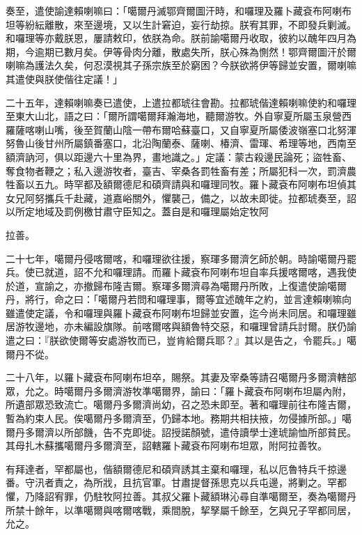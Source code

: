 \begin{pinyinscope}
奏至，遣使諭達賴喇嘛曰：「噶爾丹滅鄂齊爾圖汗時，和囉理及羅卜藏袞布阿喇布坦等紛紜離散，來至邊境，又以生計窘迫，妄行劫掠。朕宥其罪，不即發兵剿滅。和囉理等亦戴朕恩，屢請敕印，依朕為命。朕前諭噶爾丹收取，彼約以醜年四月為期，今逾期已數月矣。伊等骨肉分離，散處失所，朕心殊為惻然！鄂齊爾圖汗於爾喇嘛為護法久矣，何忍漠視其子孫宗族至於窮困？今朕欲將伊等歸並安置，爾喇嘛其遣使與朕使偕往定議！」

二十五年，達賴喇嘛奏已遣使，上遣拉都琥往會勘。拉都琥偕達賴喇嘛使約和囉理至東大山北，語之曰：「爾所謂噶爾拜瀚海地，聽爾游牧。外自寧夏所屬玉泉營西羅薩喀喇山嘴，後至賀蘭山陰一帶布爾哈蘇臺口，又自寧夏所屬倭波嶺塞口北努渾努魯山後甘州所屬鎮番塞口，北沿陶蘭泰、薩喇、椿濟、雷琿、希理等地，西南至額濟訥河，俱以距邊六十里為界，畫地識之。」定議：蒙古殺邊民論死；盜牲畜、奪食物者鞭之；私入邊游牧者，臺吉、宰桑各罰牲畜有差；所屬犯科一次，罰濟農牲畜以五九。時罕都及額爾德尼和碩齊請與和囉理同牧。羅卜藏袞布阿喇布坦偵其女兄阿努攜兵千赴藏，道嘉峪關外，懼襲己，備之，以故未即徙。拉都琥奏至，詔以所定地域及罰例檄甘肅守臣知之。蓋自是和囉理屬始定牧阿

拉善。

二十七年，噶爾丹侵喀爾喀，和囉理欲往援，察琿多爾濟乞師於朝。時諭噶爾丹罷兵。使已就道，詔不允和囉理請。而羅卜藏袞布阿喇布坦自率兵援喀爾喀，遇我使於道，宣諭之，亦撤歸布隆吉爾。察琿多爾濟尋為噶爾丹所敗，上復遣使諭噶爾丹，將行，命之曰：「噶爾丹若問和囉理事，爾等宜述醜年之約，並言達賴喇嘛向雖遣使定議，令和囉理與羅卜藏袞布阿喇布坦歸並安置，迄今尚未同居。和囉理雖居游牧邊地，亦未編設旗隊。前喀爾喀與額魯特交惡，和囉理曾請兵討爾。朕仍諭遣之曰：『朕欲使爾等安處游牧而已，豈肯給爾兵耶？』其以是告之，令罷兵。」噶爾丹不從。

二十八年，以羅卜藏袞布阿喇布坦卒，賜祭。其妻及宰桑等請召噶爾丹多爾濟轄部眾，允之。時噶爾丹多爾濟游牧準噶爾界，諭曰：「羅卜藏袞布阿喇布坦屬內附，所遺部眾恐致流亡。噶爾丹多爾濟尚幼，召之恐未即至。著和囉理前往布隆吉爾，暫為約束人民。俟噶爾丹多爾濟至，仍歸本地。務期共相扶掖，勿侵據所部。」噶爾丹多爾濟以所部饑，告不克即徙。詔授諾顏號，遣侍讀學士達琥諭恤所部貧民。其母扎木蘇攜噶爾丹多爾濟至，詔轄羅卜藏袞布阿喇布坦眾，附阿拉善牧。

有拜達者，罕都屬也，偕額爾德尼和碩齊誘其主棄和囉理，私以厄魯特兵千掠邊番。守汛者責之，為所戕，且抗官軍。甘肅提督孫思克以兵屯邊，將剿之。罕都懼，乃降詔宥罪，仍駐牧阿拉善。其叔父羅卜藏額琳沁尋自準噶爾至，奏為噶爾丹所禁十餘年，以準噶爾與喀爾喀戰，乘間脫，挈孥屬千餘至，乞與兄子罕都同居，允之。


\end{pinyinscope}
